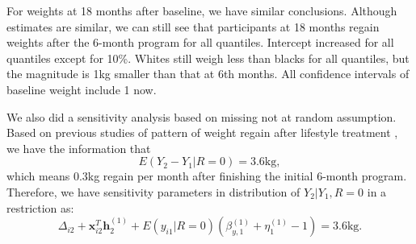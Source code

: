 \documentclass[12pt]{article}
\begin{document}
For weights at 18 months after baseline, we have similar conclusions.
Although estimates are similar, we can still see that participants at
18 months regain weights after the 6-month program for all
quantiles. Intercept increased for all quantiles except for
10\%. Whites still weigh less than blacks for all quantiles, but the
magnitude is 1kg smaller than that at 6th months.  All confidence
intervals of baseline weight include 1 now.

We also did a sensitivity analysis based on missing not at random
assumption. Based on previous studies of pattern of weight regain
after lifestyle treatment \citep{wadden2001, perri2008extended}, we
have the information that
\begin{displaymath}
  E(Y_2 - Y_1| R=0) = 3.6 \text{kg},
\end{displaymath}
which means 0.3kg regain per month after finishing the initial 6-month
program.  Therefore, we have sensitivity parameters in distribution of
$Y_2|Y_1, R=0$ in a restriction as:
\begin{displaymath}
  \Delta_{i2} + \bm x_{i2}^T \bm h_2^{(1)} + E(y_{i1}|R=0)(\beta_{y,1}^{(1)} +\eta_1^{(1)} - 1) = 3.6 \text{kg}.
\end{displaymath}
\end{document}
